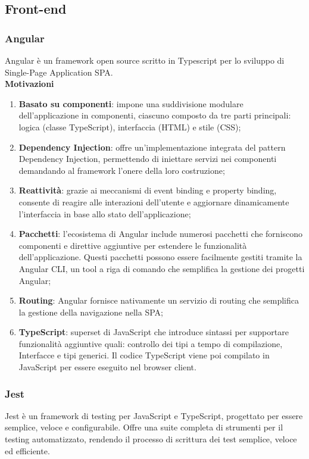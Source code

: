 
\subsection{Front-end}
\label{subsec:front-end}

\subsubsection{Angular}
\label{subsubsec:angular}
Angular è un framework open source scritto in Typescript per lo sviluppo di Single-Page Application SPA.\\

\textbf{Motivazioni}
\begin{enumerate}
    \item \textbf{Basato su componenti}: impone una suddivisione modulare dell'applicazione in componenti, ciascuno composto da tre parti principali: logica (classe TypeScript), interfaccia (HTML) e stile (CSS);  
    \item \textbf{Dependency Injection}: offre un'implementazione integrata del pattern Dependency Injection, permettendo di iniettare servizi nei componenti demandando al framework l'onere della loro costruzione;
    \item \textbf{Reattività}: grazie ai meccanismi di event binding e property binding, consente di reagire alle interazioni dell'utente e aggiornare dinamicamente l'interfaccia in base allo stato dell'applicazione;  
    \item \textbf{Pacchetti}: l'ecosistema di Angular include numerosi pacchetti che forniscono componenti e direttive aggiuntive per estendere le funzionalità dell'applicazione.  
    Questi pacchetti possono essere facilmente gestiti tramite la Angular CLI, un tool a riga di comando che semplifica la gestione dei progetti Angular;  
    \item \textbf{Routing}: Angular fornisce nativamente un servizio di routing che semplifica la gestione della navigazione nella SPA; 
    \item \textbf{TypeScript}: superset di JavaScript che introduce sintassi per supportare funzionalità aggiuntive quali: controllo dei tipi a tempo di compilazione, Interfacce e tipi generici.
    Il codice TypeScript viene poi compilato in JavaScript per essere eseguito nel browser client.
\end{enumerate}

\subsubsection{Jest}
\label{subsubsec:jest}
Jest è un framework di testing per JavaScript e TypeScript, progettato per essere semplice, veloce e configurabile.
Offre una suite completa di strumenti per il testing automatizzato, rendendo il processo di scrittura dei test semplice, veloce ed efficiente.\\

